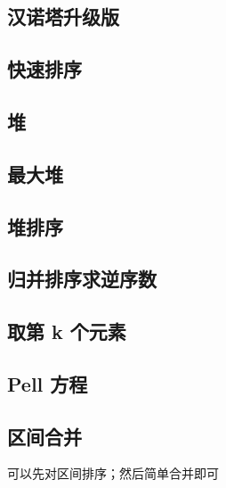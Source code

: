 \documentclass[a4paper]{article}
\begin{document}
\begin{CJK*}{UTF8}{gbsn}
\begin{multicols}{3}
\begin{flushleft}
\subsection{汉诺塔升级版}


\subsection{快速排序}


\subsection{堆}


\subsection{最大堆}


\subsection{堆排序}


\subsection{归并排序求逆序数}


\subsection{取第 k 个元素}


\subsection{Pell 方程}


\subsection{区间合并}
可以先对区间排序；然后简单合并即可\\


\end{flushleft}
\end{multicols}
\end{CJK*}
\end{document}
